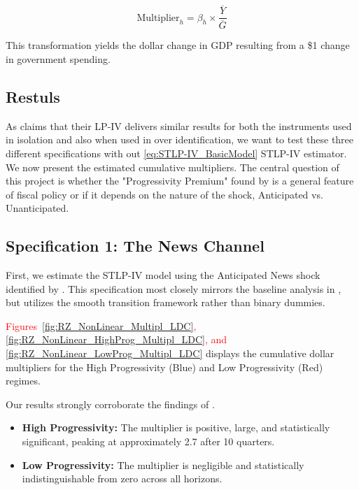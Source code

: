 \documentclass[12pt,letterpaper]{article}
\begin{document}
\begin{equation}
    \text{Multiplier}_h = \beta_h \times \frac{\overline{Y}}{\overline{G}}
\end{equation}

This transformation yields the dollar change in GDP resulting from a \$1 change in government spending.

\subsection{Restuls}
As \cite{FN} claims that their LP-IV delivers similar results for both the instruments used in isolation and also when  used in over identification, we want to test these three different specifications with out \eqref{eq:STLP-IV_BasicModel} STLP-IV estimator.
\\
We now present the estimated cumulative multipliers. The central question of this project is whether the "Progressivity Premium" found by \cite{FN} is a general feature of fiscal policy or if it depends on the nature of the shock, Anticipated vs. Unanticipated.

\subsection{Specification 1: The News Channel}
First, we estimate the STLP-IV model using the Anticipated News shock identified by \cite{RameyZubairy2018}. This specification most closely mirrors the baseline analysis in \cite{FN}, but utilizes the smooth transition framework rather than binary dummies.

\textcolor{red}{Figures~\ref{fig:RZ_NonLinear_Multipl_LDC},
\ref{fig:RZ_NonLinear_HighProg_Multipl_LDC}, and \ref{fig:RZ_NonLinear_LowProg_Multipl_LDC} }displays the cumulative dollar multipliers for the High Progressivity (Blue) and Low Progressivity (Red) regimes.

Our results strongly corroborate the findings of \cite{FN}. 
\begin{itemize}
    \item \textbf{High Progressivity:} The multiplier is positive, large, and statistically significant, peaking at approximately 2.7 after 10 quarters.
    \item \textbf{Low Progressivity:} The multiplier is negligible and statistically indistinguishable from zero across all horizons.
\end{itemize}
\end{document}
